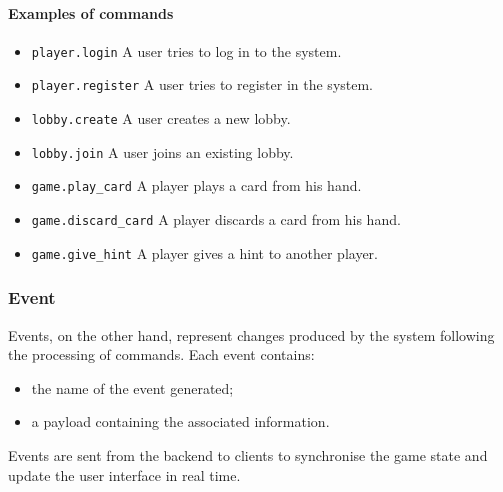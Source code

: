 \documentclass{scrartcl}
\begin{document}
  \paragraph{Examples of commands}
  \begin{itemize}
      \item \texttt{player.login} \newline A user tries to log in to the system.
      \item \texttt{player.register} \newline A user tries to register in the system.
      \item \texttt{lobby.create} \newline A user creates a new lobby.
      \item \texttt{lobby.join} \newline A user joins an existing lobby.
      \item \texttt{game.play\_card} \newline A player plays a card from his hand.
      \item \texttt{game.discard\_card} \newline A player discards a card from his hand.
      \item \texttt{game.give\_hint} \newline A player gives a hint to another player.
  \end{itemize}
  
  \subsubsection{Event}
  Events, on the other hand, represent changes produced by the system following the processing of commands.  
  Each event contains:
  \begin{itemize}
      \item the name of the event generated;
      \item a payload containing the associated information.
  \end{itemize}
  Events are sent from the backend to clients to synchronise the game state and update the user interface in real time.
\end{document}
